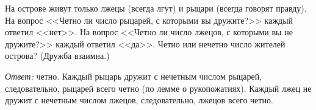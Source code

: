 На острове живут только лжецы (всегда лгут) и рыцари (всегда говорят правду).
На вопрос <<Четно ли число рыцарей, с которыми вы дружите?>> каждый ответил
<<нет>>.
На вопрос <<Четно ли число лжецов, с которыми вы не дружите?>> каждый ответил
<<да>>.
Четно или нечетно число жителей острова?
(Дружба взаимна.)

\solution
\emph{Ответ:} четно.
Каждый рыцарь дружит с нечетным числом рыцарей, следовательно, рыцарей всего
четно (по лемме о рукопожатиях).
Каждый лжец не дружит с нечетным числом лжецов, следовательно, лжецов всего
четно.

